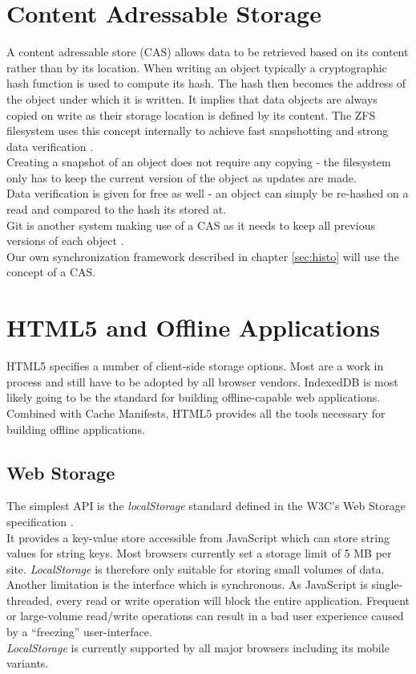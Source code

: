 \section{Content Adressable Storage}
\label{sec:background.cas}
A content adressable store (CAS) allows data to be retrieved based on its content rather than by its location.
When writing an object typically a cryptographic hash function is used to compute its hash.
The hash then becomes the address of the object under which it is written.
It implies that data objects are always copied on write as their storage location is defined by its content.
The ZFS filesystem uses this concept internally to achieve fast snapshotting and strong data verification \cite{strobl2008zfs}.\\
Creating a snapshot of an object does not require any copying - the filesystem only has to keep the current version of the object as updates are made.\\
Data verification is given for free as well - an object can simply be re-hashed on a read and compared to the hash its stored at.\\
Git is another system making use of a CAS as it needs to keep all previous versions of each object \cite{swicegood2008pragmatic}.\\
Our own synchronization framework described in chapter \ref{sec:histo} will use the concept of a CAS.

\section{HTML5 and Offline Applications}
HTML5 specifies a number of client-side storage options. Most are a work in process and still have to be adopted by all browser vendors. IndexedDB is most likely going to be the standard for building offline-capable web applications. Combined with Cache Manifests, HTML5 provides all the tools necessary for building offline applications.

\subsection{Web Storage}
The simplest API is the \emph{localStorage} standard defined in the W3C's Web Storage specification \cite{webstorage}.\\
It provides a key-value store accessible from JavaScript which can store string values for string keys.
Most browsers currently set a storage limit of 5 MB per site.
\emph{LocalStorage} is therefore only suitable for storing small volumes of data.\\
Another limitation is the interface which is synchronous. As JavaScript is single-threaded, every read or write operation will block the entire application.
Frequent or large-volume read/write operations can result in a bad user experience caused by a ``freezing'' user-interface.\\
\emph{LocalStorage} is currently supported by all major browsers including its mobile variants.

